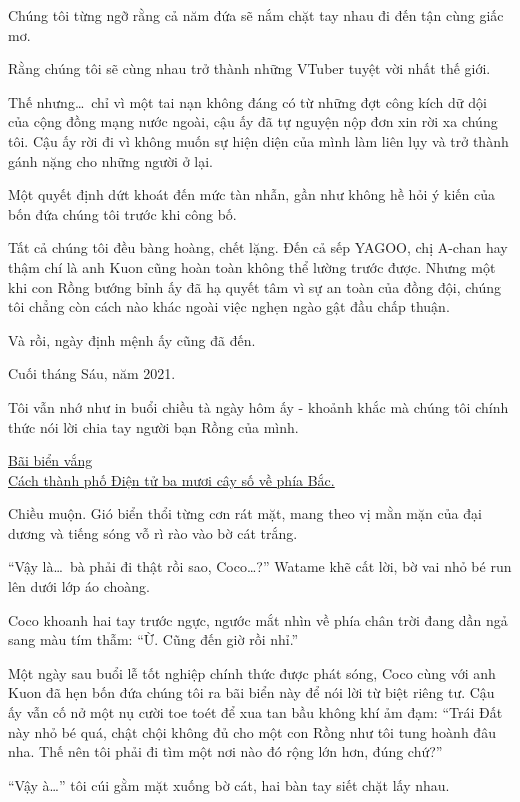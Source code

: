 \documentclass[../main.tex]{subfiles}
\begin{document}
Chúng tôi từng ngỡ rằng cả năm đứa sẽ nắm chặt tay nhau đi đến tận cùng giấc mơ.

Rằng chúng tôi sẽ cùng nhau trở thành những VTuber tuyệt vời nhất thế giới.

Thế nhưng\dots\ chỉ vì một tai nạn không đáng có từ những đợt công kích dữ dội của cộng đồng mạng nước ngoài, cậu ấy đã tự nguyện nộp đơn xin rời xa chúng tôi. Cậu ấy rời đi vì không muốn sự hiện diện của mình làm liên lụy và trở thành gánh nặng cho những người ở lại.

Một quyết định dứt khoát đến mức tàn nhẫn, gần như không hề hỏi ý kiến của bốn đứa chúng tôi trước khi công bố.

Tất cả chúng tôi đều bàng hoàng, chết lặng. Đến cả sếp YAGOO, chị A-chan hay thậm chí là anh Kuon cũng hoàn toàn không thể lường trước được. Nhưng một khi con Rồng bướng bỉnh ấy đã hạ quyết tâm vì sự an toàn của đồng đội, chúng tôi chẳng còn cách nào khác ngoài việc nghẹn ngào gật đầu chấp thuận.

Và rồi, ngày định mệnh ấy cũng đã đến.

Cuối tháng Sáu, năm 2021.

Tôi vẫn nhớ như in buổi chiều tà ngày hôm ấy - khoảnh khắc mà chúng tôi chính thức nói lời chia tay người bạn Rồng của mình.

\ct

\begin{center}
    \uline{Bãi biển vắng\\Cách thành phố Điện tử ba mươi cây số về phía Bắc.}
\end{center}

Chiều muộn. Gió biển thổi từng cơn rát mặt, mang theo vị mằn mặn của đại dương và tiếng sóng vỗ rì rào vào bờ cát trắng.

``Vậy là\dots\ bà phải đi thật rồi sao, Coco\dots?'' Watame khẽ cất lời, bờ vai nhỏ bé run lên dưới lớp áo choàng.

Coco khoanh hai tay trước ngực, ngước mắt nhìn về phía chân trời đang dần ngả sang màu tím thẫm: ``Ừ. Cũng đến giờ rồi nhỉ.''

Một ngày sau buổi lễ tốt nghiệp chính thức được phát sóng, Coco cùng với anh Kuon đã hẹn bốn đứa chúng tôi ra bãi biển này để nói lời từ biệt riêng tư. Cậu ấy vẫn cố nở một nụ cười toe toét để xua tan bầu không khí ảm đạm: ``Trái Đất này nhỏ bé quá, chật chội không đủ cho một con Rồng như tôi tung hoành đâu nha. Thế nên tôi phải đi tìm một nơi nào đó rộng lớn hơn, đúng chứ?''

``Vậy à\dots'' tôi cúi gằm mặt xuống bờ cát, hai bàn tay siết chặt lấy nhau.
\end{document}
